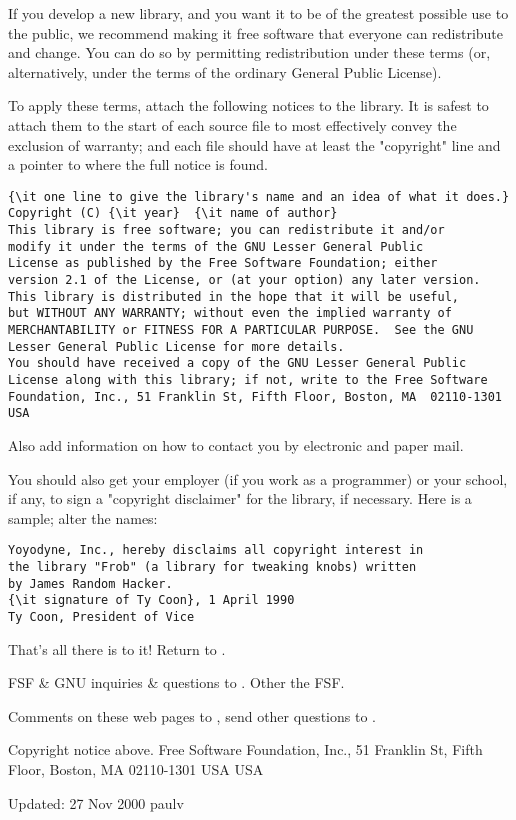 If you develop a new library, and you want it to be of the greatest possible
use to the public, we recommend making it free software that everyone can
redistribute and change. You can do so by permitting redistribution under
these terms (or, alternatively, under the terms of the ordinary General Public
License). 

To apply these terms, attach the following notices to the library. It is
safest to attach them to the start of each source file to most effectively
convey the exclusion of warranty; and each file should have at least the
"copyright" line and a pointer to where the full notice is found. 

\footnotesize
\begin{verbatim}
{\it one line to give the library's name and an idea of what it does.}
Copyright (C) {\it year}  {\it name of author}
This library is free software; you can redistribute it and/or
modify it under the terms of the GNU Lesser General Public
License as published by the Free Software Foundation; either
version 2.1 of the License, or (at your option) any later version.
This library is distributed in the hope that it will be useful,
but WITHOUT ANY WARRANTY; without even the implied warranty of
MERCHANTABILITY or FITNESS FOR A PARTICULAR PURPOSE.  See the GNU
Lesser General Public License for more details.
You should have received a copy of the GNU Lesser General Public
License along with this library; if not, write to the Free Software
Foundation, Inc., 51 Franklin St, Fifth Floor, Boston, MA  02110-1301
USA
\end{verbatim}
\normalsize

Also add information on how to contact you by electronic and paper mail. 

You should also get your employer (if you work as a programmer) or your
school, if any, to sign a "copyright disclaimer" for the library, if
necessary. Here is a sample; alter the names: 

\footnotesize
\begin{verbatim}
Yoyodyne, Inc., hereby disclaims all copyright interest in
the library "Frob" (a library for tweaking knobs) written
by James Random Hacker.
{\it signature of Ty Coon}, 1 April 1990
Ty Coon, President of Vice
\end{verbatim}
\normalsize

That's all there is to it! 
Return to 
. 

FSF \& GNU inquiries \& questions to 
. Other 
 the FSF. 

Comments on these web pages to 
, send other
questions to 
. 

Copyright notice above.
Free Software Foundation, Inc., 51 Franklin St, Fifth Floor,
Boston, MA  02110-1301  USA
USA 

Updated: 27 Nov 2000 paulv 
